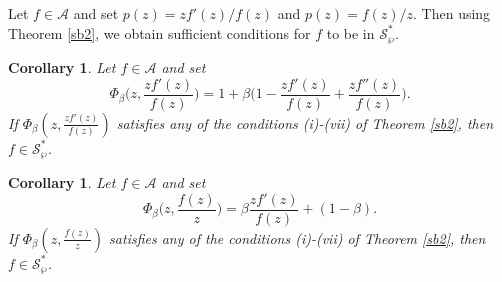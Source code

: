 \documentclass[12pt, reqno]{amsart}
\numberwithin{equation}{section}
\theoremstyle{plain}
\newtheorem{corollary}[theorem]{Corollary}
\theoremstyle{definition}
\theoremstyle{remark}
\begin{document}
Let $f\in\mathcal{A}$ and set $p(z)=zf'(z)/f(z)$ and $p(z)=f(z)/z$. Then using Theorem \ref{sb2}, we obtain sufficient conditions for $f$ to be in $\mathcal{S}^*_{\wp}$.

\begin{corollary}
	Let $f\in\mathcal{A}$ and set
	\begin{equation*}
	\Phi_\beta\biggl(z,\frac{zf'(z)}{f(z)}\biggl)=1+\beta\biggl(1-\frac{zf'(z)}{f(z)}+\frac{zf''(z)}{f(z)}\biggl).    	
	\end{equation*}
	If $ \Phi_\beta\left(z,\frac{zf'(z)}{f(z)}\right)$ satisfies any of the conditions (i)-(vii) of Theorem \ref{sb2}, then $ f\in \mathcal{S}^*_{\wp} $.
\end{corollary}
\begin{corollary}
	Let $f\in\mathcal{A}$ and set
	\begin{equation*}
	\Phi_\beta\biggl(z,\frac{f(z)}{z}\biggl)=\beta \frac{zf'(z)}{f(z)}+(1-\beta).    	
	\end{equation*}
	If $ \Phi_\beta\left(z,\frac{f(z)}{z}\right)$ satisfies any of the conditions (i)-(vii) of Theorem \ref{sb2}, then $ f\in \mathcal{S}^*_{\wp} $.
\end{corollary}
\end{document}
